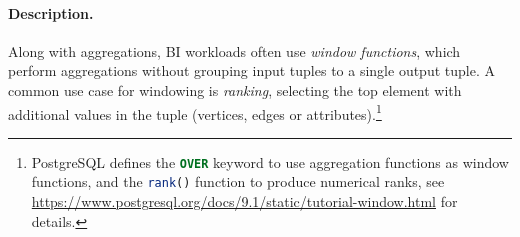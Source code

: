 
\paragraph{Description.}

Along with aggregations, BI workloads often use \emph{window functions}, which
perform aggregations without grouping input tuples to a single output tuple.  A
common use case for windowing is \emph{ranking}, \ie selecting the top element
with additional values in the tuple (vertices, edges or
attributes).\footnote{PostgreSQL defines the \lstinline[language=sql]{OVER}
keyword to use aggregation functions as window functions, and the
\lstinline[language=sql]{rank()} function to produce numerical ranks, see
\url{https://www.postgresql.org/docs/9.1/static/tutorial-window.html} for
details.}


